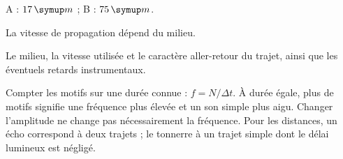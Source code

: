 \par\noindent\begin{minipage}{\linewidth}
\label{cor-defi-17}\begin{questions}
\item A : $17\unite m$ ; B : $75\unite m$.
\item La vitesse de propagation dépend du milieu.
\item Le milieu, la vitesse utilisée et le caractère aller-retour du trajet, ainsi que les éventuels retards instrumentaux.
\end{questions}
\end{minipage}
\par\noindent\begin{minipage}{\linewidth}
\label{cor-activite-17}
Compter les motifs sur une durée connue : $f=N/\Delta t$. À durée égale, plus de motifs signifie une fréquence plus élevée et un son simple plus aigu. Changer l’amplitude ne change pas nécessairement la fréquence. Pour les distances, un écho correspond à deux trajets ; le tonnerre à un trajet simple dont le délai lumineux est négligé.\par\end{minipage}
